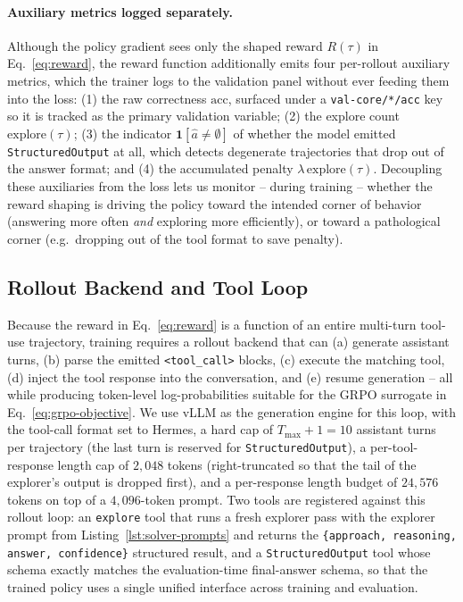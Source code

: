 \paragraph{Auxiliary metrics logged separately.}
Although the policy gradient sees only the shaped reward $R(\tau)$ in Eq.~\eqref{eq:reward}, the reward function additionally emits four per-rollout auxiliary metrics, which the trainer logs to the validation panel without ever feeding them into the loss: (1) the raw correctness $\mathrm{acc}$, surfaced under a \texttt{val-core/*/acc} key so it is tracked as the primary validation variable; (2) the explore count $\mathrm{explore}(\tau)$; (3) the indicator $\mathbf{1}[\hat{a} \ne \emptyset]$ of whether the model emitted \texttt{StructuredOutput} at all, which detects degenerate trajectories that drop out of the answer format; and (4) the accumulated penalty $\lambda\,\mathrm{explore}(\tau)$. Decoupling these auxiliaries from the loss lets us monitor -- during training -- whether the reward shaping is driving the policy toward the intended corner of behavior (answering more often \emph{and} exploring more efficiently), or toward a pathological corner (e.g.\ dropping out of the tool format to save penalty).

\subsection{Rollout Backend and Tool Loop}
\label{app:training-rollout}

Because the reward in Eq.~\eqref{eq:reward} is a function of an entire multi-turn tool-use trajectory, training requires a rollout backend that can (a) generate assistant turns, (b) parse the emitted \texttt{<tool\_call>} blocks, (c) execute the matching tool, (d) inject the tool response into the conversation, and (e) resume generation -- all while producing token-level log-probabilities suitable for the GRPO surrogate in Eq.~\eqref{eq:grpo-objective}. We use vLLM as the generation engine for this loop, with the tool-call format set to Hermes, a hard cap of $T_{\max}{+}1 = 10$ assistant turns per trajectory (the last turn is reserved for \texttt{StructuredOutput}), a per-tool-response length cap of $2{,}048$ tokens (right-truncated so that the tail of the explorer's output is dropped first), and a per-response length budget of $24{,}576$ tokens on top of a $4{,}096$-token prompt. Two tools are registered against this rollout loop: an \texttt{explore} tool that runs a fresh explorer pass with the explorer prompt from Listing~\ref{lst:solver-prompts} and returns the \texttt{\{approach, reasoning, answer, confidence\}} structured result, and a \texttt{StructuredOutput} tool whose schema exactly matches the evaluation-time final-answer schema, so that the trained policy uses a single unified interface across training and evaluation.

